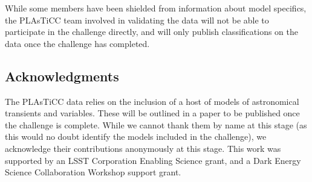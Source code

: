 \documentclass[\docopts]{\docclass}
\begin{document}
While some members have been shielded from information about model specifics, the PLAsTiCC team involved in validating the data will not be able to participate in the challenge directly, and will only publish classifications on the data once the challenge has completed.


\subsection{Acknowledgments}
The PLAsTiCC data relies on the inclusion of a host of models of astronomical transients and variables. These will be outlined in a paper to be published once the challenge is complete. While we cannot thank them by name at this stage (as this would no doubt identify the models included in the challenge), we acknowledge their contributions anonymously at this stage. This work was supported by an LSST Corporation Enabling Science grant, and a Dark Energy Science Collaboration Workshop support grant.










%
\end{document}
